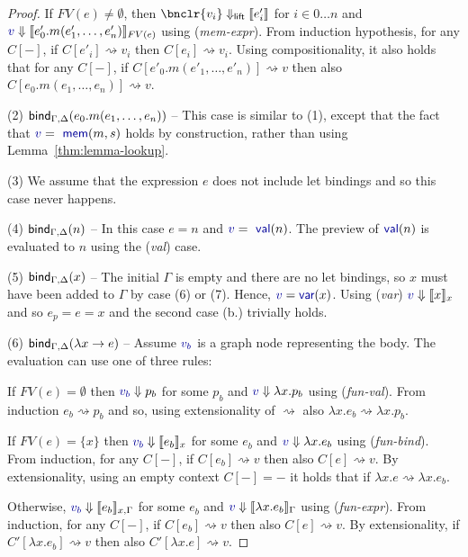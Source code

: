 \documentclass[sigplan,10pt]{acmart}\settopmatter{printfolios=true,printccs=false,printacmref=false}
\theoremstyle{plain}
\theoremstyle{definition}
\newcommand{\ident}[1]{\textnormal{\sffamily #1}}
\newcommand{\bndclr}[1]{\textcolor{kvdclr}{#1}}
\newcommand{\bnd}[1]{\textnormal{\textcolor{kvdclr}{\sffamily #1}}}
\begin{document}
\begin{proof}
  If $FV(e)\neq\emptyset$, then $\bnclr{v_i} \Downarrow_\ident{lift} \llbracket e'_i \rrbracket$ for $i\in 0\ldots n$ and 
  $\bndclr{v}\Downarrow \llbracket e'_0.m(e'_1, \ldots, e'_n) \rrbracket_{FV(e)}$ using (\emph{mem-expr}).
  From induction hypothesis, for any $C[-]$, if $C[e'_i] \rightsquigarrow v_i$ then $C[e_i] \rightsquigarrow v_i$.
  Using compositionality, it also holds that for any $C[-]$, if $C[e'_0.m(e'_1, \ldots, e'_n)]\rightsquigarrow v$
  then also $C[e_0.m(e_1, \ldots, e_n)] \rightsquigarrow v$.   
  
\vspace{0.75em}\noindent(2) $\ident{bind}_{\Gamma, \Delta}(e_0.m(e_1, \ldots, e_n))$ --
  This case is similar to (1), except that the fact that $\bndclr{v} = \bnd{mem}(m, s)$
  holds by construction, rather than using Lemma~\ref{thm:lemma-lookup}.

\vspace{0.75em}\noindent(3) We assume that the expression $e$ does not include let bindings and
  so this case never happens.

\vspace{0.75em}\noindent(4) $\ident{bind}_{\Gamma, \Delta}(n)$ -- In this case $e=n$ and $\bndclr{v} = \bnd{val}(n)$. The preview of
  $\bnd{val}(n)$ is evaluated to $n$ using the (\emph{val}) case.

\vspace{0.75em}\noindent(5) $\ident{bind}_{\Gamma, \Delta}(x)$ -- The initial $\Gamma$ is empty and
  there are no let bindings, so $x$ must have been added to $\Gamma$ by case (6) or (7). Hence,
  $\bndclr{v}=\bnd{var}(x)$. Using (\emph{var}) $\bndclr{v}\Downarrow \llbracket x \rrbracket_{x}$
  and so $e_p = e = x$ and the second case (b.) trivially holds.  

\vspace{0.75em}\noindent(6) $\ident{bind}_{\Gamma, \Delta}(\lambda x\rightarrow e)$ -- Assume
  $\bndclr{v_b}$ is a graph node representing the body. The evaluation can use one of three rules: 
  
  If $FV(e)=\emptyset$ then $\bndclr{v_b}\Downarrow p_b$ for some $p_b$ and $\bndclr{v}\Downarrow \lambda x.p_b$ 
  using (\emph{fun-val}). From induction $e_b \rightsquigarrow p_b$
  and so, using extensionality of $\rightsquigarrow$ also $\lambda x.e_b \rightsquigarrow \lambda x.p_b$.

  If $FV(e)=\{x\}$ then $\bndclr{v_b}\Downarrow \llbracket e_b \rrbracket_x$ for some $e_b$ and
  $\bndclr{v}\Downarrow \lambda x.e_b$ using (\emph{fun-bind}). From 
  induction, for any $C[-]$, if $C[e_b] \rightsquigarrow v$ then also $C[e] \rightsquigarrow v$.
  By extensionality, using an empty context $C[-]=-$ it holds that if $\lambda x.e \rightsquigarrow \lambda x.e_b$.

  Otherwise, $\bndclr{v_b}\Downarrow \llbracket e_b \rrbracket_{x,\Gamma}$ for some $e_b$ and
  $\bndclr{v}\Downarrow \llbracket\lambda x.e_b\rrbracket_\Gamma$ using (\emph{fun-expr}). From
  induction, for any $C[-]$, if $C[e_b] \rightsquigarrow v$ then also $C[e] \rightsquigarrow v$.
  By extensionality, if $C'[\lambda x.e_b] \rightsquigarrow v$ then also
  $C'[\lambda x.e] \rightsquigarrow v$.
\end{proof}
\end{document}
